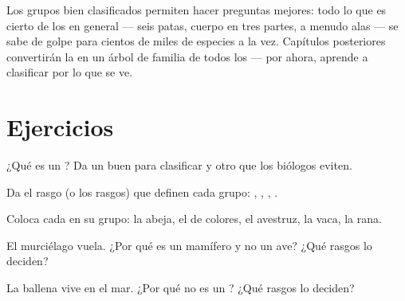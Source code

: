 \begin{remark}\label{rem:g3:sorting-living-things:science}
Los grupos bien clasificados permiten hacer preguntas mejores: todo lo
que es cierto de los  en general --- seis patas, cuerpo en
tres partes, a menudo alas --- se sabe de golpe para cientos de miles
de especies a la vez. Capítulos posteriores convertirán la
 en un árbol de familia de todos los  ---
por ahora, aprende a clasificar por lo que se ve.
\end{remark}

\section{Ejercicios}

\begin{exercise}[$\star$]\label{exo:g3:sorting-living-things:1}
¿Qué es un ? Da un buen  para clasificar  y
otro que los biólogos eviten.
\end{exercise}

\begin{exercise}[$\star$]\label{exo:g3:sorting-living-things:2}
Da el rasgo (o los rasgos) que definen cada grupo: , ,
, .
\end{exercise}

\begin{exercise}[$\star$]\label{exo:g3:sorting-living-things:3}
Coloca cada  en su grupo: la abeja, el  de colores, el
avestruz, la vaca, la rana.
\end{exercise}

\begin{exercise}[$\star$]\label{exo:g3:sorting-living-things:4}
El murciélago vuela. ¿Por qué es un mamífero y no un ave? ¿Qué rasgos
lo deciden?
\end{exercise}

\begin{exercise}[$\star$]\label{exo:g3:sorting-living-things:5}
La ballena vive en el mar. ¿Por qué no es un ? ¿Qué rasgos lo
deciden?
\end{exercise}

